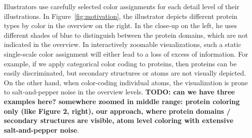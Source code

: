 \documentclass{egpubl}
\begin{document}
	
	Illustrators use carefully selected color assignments for each detail level of their illustrations. 
	In Figure~\ref{fig:motivation}, the illustrator depicts different protein types by color in the overview on the right. 
	In the close-up on the left, he uses different shades of blue to distinguish between the protein domains, which are not indicated in the overview. 
	In interactively zoomable visualizations, such a static single-scale color assignment will either lead to a loss of excess of information. 
	For example, if we apply categorical color coding to proteins, then proteins can be easily discriminated, but secondary structures or atoms are not visually depicted.
	On the other hand, when color-coding individual atoms, the visualization is prone to salt-and-pepper noise in the overview levels. 
	\textbf{TODO: can we have three examples here? somewhere zoomed in middle range: protein coloring only (like Figure 2, right), our approach, where protein domains / secondary structures are visible, atom level coloring with extensive salt-and-pepper noise}. 
		
\end{document}
